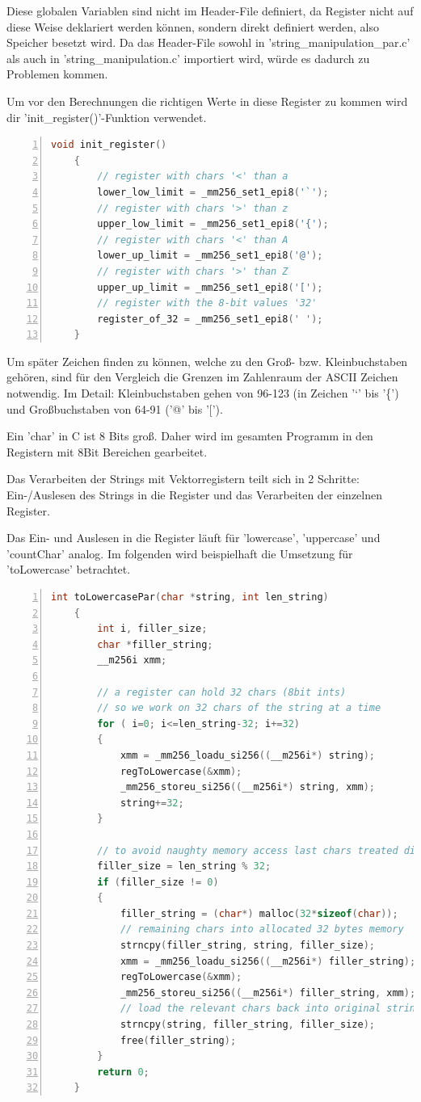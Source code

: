\documentclass[plainarticle,zihtitle,german,final,hyperref,utf8]{zihpub}
\begin{document}
Diese globalen Variablen sind nicht im Header-File definiert, da Register nicht auf diese Weise deklariert werden können, sondern direkt definiert werden, also Speicher besetzt wird. Da das Header-File sowohl in 'string\_manipulation\_par.c' als auch in 'string\_manipulation.c' importiert wird, würde es dadurch zu Problemen kommen.

Um vor den Berechnungen die richtigen Werte in diese Register zu kommen wird dir 'init\_register()'-Funktion verwendet.

\begin{lstlisting}[language=c, numbers=left]
	void init_register()
	{
		// register with chars '<' than a
		lower_low_limit = _mm256_set1_epi8('`');
		// register with chars '>' than z
		upper_low_limit = _mm256_set1_epi8('{');
		// register with chars '<' than A
		lower_up_limit = _mm256_set1_epi8('@');
		// register with chars '>' than Z
		upper_up_limit = _mm256_set1_epi8('[');
		// register with the 8-bit values '32'
		register_of_32 = _mm256_set1_epi8(' ');
	}
\end{lstlisting}

Um später Zeichen finden zu können, welche zu den Groß- bzw. Kleinbuchstaben gehören, sind für den Vergleich die Grenzen im Zahlenraum der ASCII Zeichen notwendig. Im Detail: Kleinbuchstaben gehen von 96-123 (in Zeichen '`' bis '\{') und Großbuchstaben von 64-91 ('@' bis '{[}').

Ein 'char' in C ist 8 Bits groß. Daher wird im gesamten Programm in den Registern mit 8Bit Bereichen gearbeitet.

Das Verarbeiten der Strings mit Vektorregistern teilt sich in 2 Schritte: Ein-/Auslesen des Strings in die Register und das Verarbeiten der einzelnen Register.

Das Ein- und Auslesen in die Register läuft für 'lowercase', 'uppercase' und 'countChar' analog. Im folgenden wird beispielhaft die Umsetzung für 'toLowercase' betrachtet.

\begin{lstlisting}[language=c, numbers=left]
	int toLowercasePar(char *string, int len_string)
	{
		int i, filler_size;
		char *filler_string;
		__m256i xmm;
		
		// a register can hold 32 chars (8bit ints)
		// so we work on 32 chars of the string at a time
		for ( i=0; i<=len_string-32; i+=32)
		{
			xmm = _mm256_loadu_si256((__m256i*) string);
			regToLowercase(&xmm);
			_mm256_storeu_si256((__m256i*) string, xmm);
			string+=32;
		}
		
		// to avoid naughty memory access last chars treated different
		filler_size = len_string % 32;
		if (filler_size != 0)
		{
			filler_string = (char*) malloc(32*sizeof(char));
			// remaining chars into allocated 32 bytes memory
			strncpy(filler_string, string, filler_size);
			xmm = _mm256_loadu_si256((__m256i*) filler_string);
			regToLowercase(&xmm);
			_mm256_storeu_si256((__m256i*) filler_string, xmm);	
			// load the relevant chars back into original string
			strncpy(string, filler_string, filler_size);
			free(filler_string);
		}
		return 0;
	}
\end{lstlisting}
\end{document}
